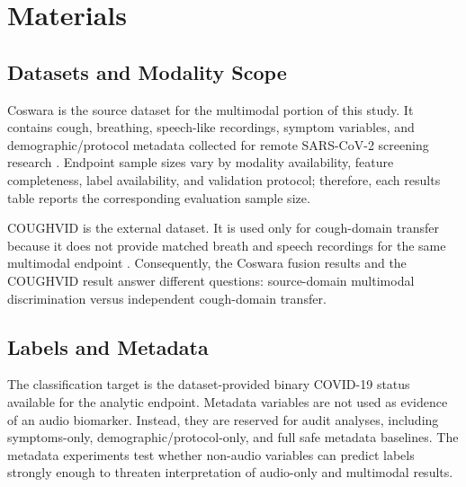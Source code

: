 \documentclass[journal]{IEEEtran}
\begin{document}
\section{Materials}
\subsection{Datasets and Modality Scope}
Coswara is the source dataset for the multimodal portion of this study. It contains cough, breathing, speech-like recordings, symptom variables, and demographic/protocol metadata collected for remote SARS-CoV-2 screening research \cite{bhattacharya2023coswara}. Endpoint sample sizes vary by modality availability, feature completeness, label availability, and validation protocol; therefore, each results table reports the corresponding evaluation sample size.

COUGHVID is the external dataset. It is used only for cough-domain transfer because it does not provide matched breath and speech recordings for the same multimodal endpoint \cite{orlandic2021coughvid}. Consequently, the Coswara fusion results and the COUGHVID result answer different questions: source-domain multimodal discrimination versus independent cough-domain transfer.

\subsection{Labels and Metadata}
The classification target is the dataset-provided binary COVID-19 status available for the analytic endpoint. Metadata variables are not used as evidence of an audio biomarker. Instead, they are reserved for audit analyses, including symptoms-only, demographic/protocol-only, and full safe metadata baselines. The metadata experiments test whether non-audio variables can predict labels strongly enough to threaten interpretation of audio-only and multimodal results.
\end{document}
